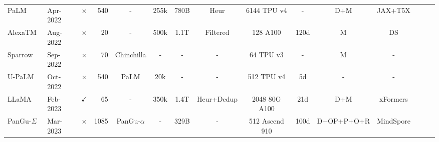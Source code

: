 \begin{table}[htbp]
\begin{center}
{\begin{tabular}{llcrccccccccccc}
PaLM~\cite{PaLM} & Apr-2022    & $\times$ & 540 & - &  255k  & 780B  & Heur & 6144 TPU v4  & - & D+M & JAX+T5X\\

AlexaTM~\cite{soltan2022alexatm}  & Aug-2022 &$\times$   & 20  & -  & 500k  & 1.1T   & Filtered  & 128 A100    & 120d  & M & DS      \\

Sparrow~\cite{glaese2022improving}  & Sep-2022 &$\times$    & 70    & Chinchilla   & - & -  & -  & 64 TPU v3   & -  & M    & -       \\

U-PaLM~\cite{U-PaLM}   & Oct-2022    & $\times$ & 540   & PaLM & 20k & - & -   & 512 TPU v4  & 5d    & - & - \\

LLaMA~\cite{touvron2023llama}    & Feb-2023 & $\checkmark$   & 65      & - & 350k & 1.4T & Heur+Dedup   & 2048 80G A100 & 21d   & D+M & xFormers     \\

{PanGu-$\Sigma$}~\cite{PanGu_sigma}    & Mar-2023  & $\times$  & 1085 & {PanGu-$\alpha$} & -  & 329B & -  & 512 Ascend 910   & 100d  & D+OP+P+O+R & MindSpore  \\
\bottomrule
\end{tabular}
} 
\end{center}
\end{table}





